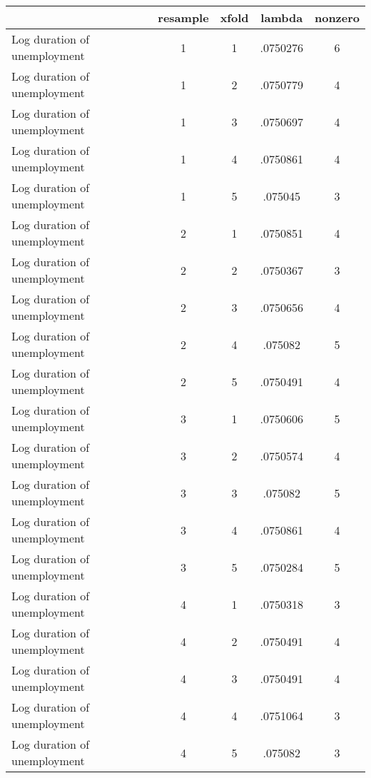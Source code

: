 \begin{tabular}{l*{4}{c}}
\hline\hline
                    &    resample&       xfold&      lambda&     nonzero\\
\hline
Log duration of unemployment&           1&           1&    .0750276&           6\\
Log duration of unemployment&           1&           2&    .0750779&           4\\
Log duration of unemployment&           1&           3&    .0750697&           4\\
Log duration of unemployment&           1&           4&    .0750861&           4\\
Log duration of unemployment&           1&           5&     .075045&           3\\
Log duration of unemployment&           2&           1&    .0750851&           4\\
Log duration of unemployment&           2&           2&    .0750367&           3\\
Log duration of unemployment&           2&           3&    .0750656&           4\\
Log duration of unemployment&           2&           4&     .075082&           5\\
Log duration of unemployment&           2&           5&    .0750491&           4\\
Log duration of unemployment&           3&           1&    .0750606&           5\\
Log duration of unemployment&           3&           2&    .0750574&           4\\
Log duration of unemployment&           3&           3&     .075082&           5\\
Log duration of unemployment&           3&           4&    .0750861&           4\\
Log duration of unemployment&           3&           5&    .0750284&           5\\
Log duration of unemployment&           4&           1&    .0750318&           3\\
Log duration of unemployment&           4&           2&    .0750491&           4\\
Log duration of unemployment&           4&           3&    .0750491&           4\\
Log duration of unemployment&           4&           4&    .0751064&           3\\
Log duration of unemployment&           4&           5&     .075082&           3\\

\end{tabular}
